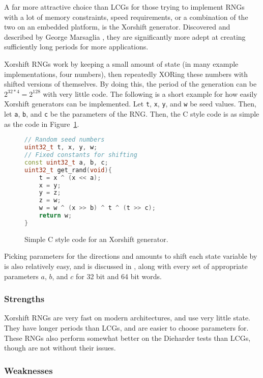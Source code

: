 A far more attractive choice than LCGs for those trying to implement RNGs with a lot of memory constraints, speed requirements, or a combination of the two on an embedded platform, is the Xorshift generator. Discovered and described by George Marsaglia \cite{marsaglia2003xorshift}, they are significantly more adept at creating sufficiently long periods for more applications.

Xorshift RNGs work by keeping a small amount of state (in many example implementations, four numbers), then repeatedly XORing these numbers with shifted versions of themselves. By doing this, the period of the generation can be $2^{32 * 4} = 2^{128}$ with very little code. The following is a short example for how easily Xorshift generators can be implemented. Let \texttt{t}, \texttt{x}, \texttt{y}, and \texttt{w} be seed values. Then, let \texttt{a}, \texttt{b}, and \texttt{c} be the parameters of the RNG. Then, the C style code is as simple as the code in Figure~\ref{fig:xorshift_code}.

\begin{figure}[tb]
\begin{lstlisting}[frame=single,language=C++,basicstyle=\ttfamily]
// Random seed numbers
uint32_t t, x, y, w;
// Fixed constants for shifting
const uint32_t a, b, c;
uint32_t get_rand(void){
    t = x ^ (x << a);
    x = y;
    y = z;
    z = w;
    w = w ^ (x >> b) ^ t ^ (t >> c);
    return w;
}
\end{lstlisting}
    \caption{Simple C style code for an Xorshift generator.}
    \label{fig:xorshift_code}
\end{figure}

Picking parameters for the directions and amounts to shift each state variable by is also relatively easy, and is discussed in \cite{marsaglia2003xorshift}, along with every set of appropriate parameters $a$, $b$, and $c$ for 32 bit and 64 bit words.

\subsubsection{Strengths}

Xorshift RNGs are very fast on modern architectures, and use very little state. They have longer periods than LCGs, and are easier to choose parameters for. These RNGs also perform somewhat better on the Dieharder tests than LCGs, though are not without their issues.

\subsubsection{Weaknesses}

